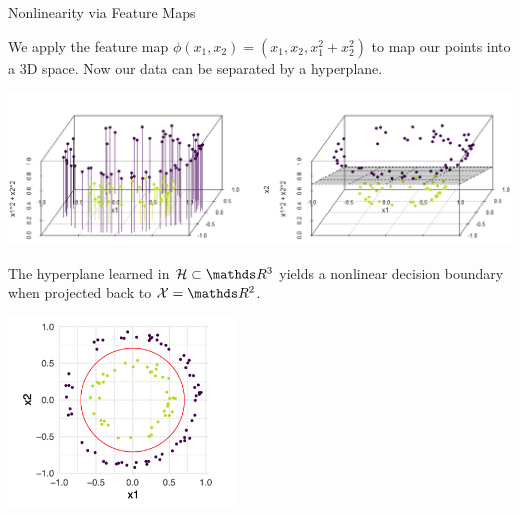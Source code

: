 \begin{vbframe}{Nonlinearity via Feature Maps}
\framebreak

\vspace*{0.5cm} 

We apply the feature map $\phi(x_1, x_2) = (x_1, x_2, x_1^2+x_2^2)$ to map our points into a 3D space. Now our data can be separated by a hyperplane.


\begin{center}
  \includegraphics{figure_man/kernels/kernel_intro_4.png}
\end{center}

\framebreak 

The hyperplane learned in $\HS \subset \R^3$ yields a nonlinear decision boundary when projected back to $\Xspace  = \R^2$.

\begin{center}
\includegraphics[width=6cm]{figure_man/kernel_intro_2.png}
\end{center}

\end{vbframe}



